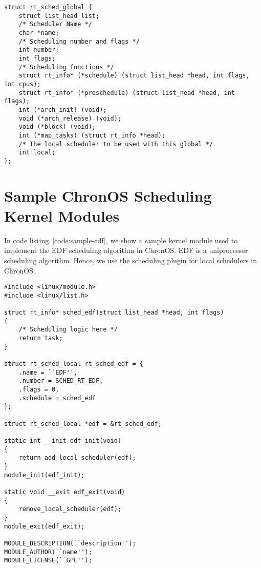 \documentclass[12pt,dvips]{report}
\begin{document}
\begin{lstlisting}[caption=Scheduler plugin for multiprocessor schedulers, label=code:globalplug]
struct rt_sched_global {
	struct list_head list;
	/* Scheduler Name */
	char *name;
	/* Scheduling number and flags */
	int number;
	int flags;
	/* Scheduling functions */
	struct rt_info* (*schedule) (struct list_head *head, int flags, int cpus);
	struct rt_info* (*preschedule) (struct list_head *head, int flags);
	int (*arch_init) (void);
	void (*arch_release) (void);
	void (*block) (void);
	int (*map_tasks) (struct rt_info *head);
	/* The local scheduler to be used with this global */
	int local;
};
\end{lstlisting}


\chapter{Sample ChronOS Scheduling Kernel Modules}\label{appendix-sample}

In code listing~\ref{code:sample-edf}, we show a sample kernel module used to implement the EDF scheduling algorithm in ChronOS. EDF is a uniprocessor scheduling algorithm. Hence, we use the scheduling plugin for local schedulers in ChronOS.
~\\

\begin{lstlisting}[caption=Sample kernel module for EDF, label=code:sample-edf]
#include <linux/module.h>
#include <linux/list.h>

struct rt_info* sched_edf(struct list_head *head, int flags)
{
	/* Scheduling logic here */
	return task;
}

struct rt_sched_local rt_sched_edf = {
	.name = ``EDF'',
	.number = SCHED_RT_EDF,
	.flags = 0,
	.schedule = sched_edf
};

struct rt_sched_local *edf = &rt_sched_edf;

static int __init edf_init(void)
{
	return add_local_scheduler(edf);
}
module_init(edf_init);

static void __exit edf_exit(void)
{
	remove_local_scheduler(edf);
}
module_exit(edf_exit);

MODULE_DESCRIPTION(``description'');
MODULE_AUTHOR(``name'');
MODULE_LICENSE(``GPL'');
\end{lstlisting}
\end{document}

